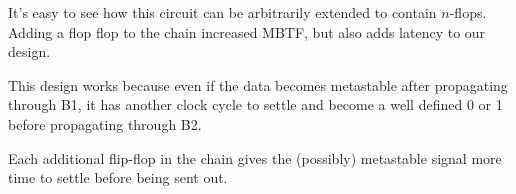 It's easy to see how this circuit can be arbitrarily extended to contain $n$-flops. Adding a flop flop to the chain increased MBTF, but also adds latency to our design.
\begin{bullets}
	\item This design works because even if the data becomes metastable after propagating through B1, it has another clock cycle to settle and become a well defined 0 or 1 before propagating through B2.
	\item Each additional flip-flop in the chain gives the (possibly) metastable signal more time to settle before being sent out.
\end{bullets}

